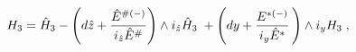 \begin{equation}
\label{H3=hH3} 
H_3 = \hat{H}_3 
-  \left(d\hat{z} + 
{\hat{E}^{ {\#}(-)}\over i_{\hat{z}}\hat{E}^{ {\#}}} 
\right)\wedge i_{\hat{z}} \hat{H}_3 \; + 
 \left(dy +  {{E}^{ {*}(-)}\over i_{y}\hat{E}^{ {*}}} \,
\right)\wedge i_y H_3  \; , 
\end{equation}

